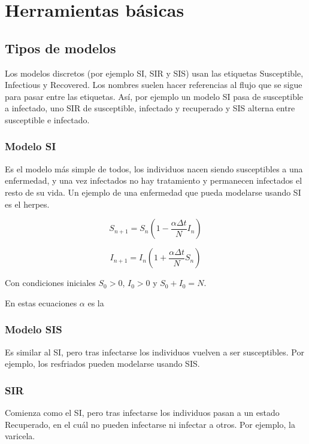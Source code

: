 \chapter{Herramientas básicas}

\section{Tipos de modelos}

Los modelos discretos (por ejemplo SI, SIR y SIS) usan las etiquetas Susceptible, Infectious y Recovered. Los nombres suelen hacer referencias al flujo que se sigue para pasar entre las etiquetas. Así, por ejemplo un modelo SI pasa de susceptible a infectado, uno SIR de susceptible, infectado y recuperado y SIS alterna entre susceptible e infectado.

\subsection{Modelo SI}
Es el modelo más simple de todos, los individuos nacen siendo susceptibles a una enfermedad, y una vez infectados no hay tratamiento y permanecen infectados el resto de su vida.
Un ejemplo de una enfermedad que pueda modelarse usando SI es el herpes.

\begin{equation}
\label{eqn: SI_S}
S_{n+1}=S_n\left( 1-\frac{\alpha\Delta t}{N}I_n\right)
\end{equation}

\begin{equation}
\label{eqn: SI_I}
I_{n+1}=I_n\left( 1+\frac{\alpha\Delta t}{N}S_n\right)
\end{equation}

Con condiciones iniciales $S_0>0$, $I_0>0$ y $S_0+I_0=N$.

En estas ecuaciones $\alpha$ es la 


\subsection{Modelo SIS}
Es similar al SI, pero tras infectarse los individuos vuelven a ser susceptibles.
Por ejemplo, los resfriados pueden modelarse usando SIS.

\subsection{SIR}
Comienza como el SI, pero tras infectarse los individuos pasan a un estado Recuperado, en el cuál no pueden infectarse ni infectar a otros.
Por ejemplo, la varicela. 

